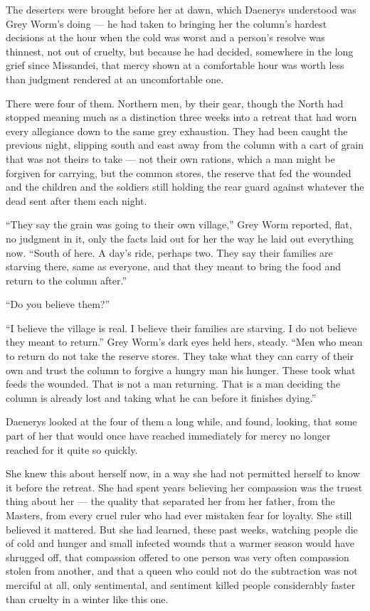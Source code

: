 The deserters were brought before her at dawn, which Daenerys understood was Grey Worm’s doing — he had taken to bringing her the column’s hardest decisions at the hour when the cold was worst and a person’s resolve was thinnest, not out of cruelty, but because he had decided, somewhere in the long grief since Missandei, that mercy shown at a comfortable hour was worth less than judgment rendered at an uncomfortable one.

There were four of them. Northern men, by their gear, though the North had stopped meaning much as a distinction three weeks into a retreat that had worn every allegiance down to the same grey exhaustion. They had been caught the previous night, slipping south and east away from the column with a cart of grain that was not theirs to take — not their own rations, which a man might be forgiven for carrying, but the common stores, the reserve that fed the wounded and the children and the soldiers still holding the rear guard against whatever the dead sent after them each night.

“They say the grain was going to their own village,” Grey Worm reported, flat, no judgment in it, only the facts laid out for her the way he laid out everything now. “South of here. A day’s ride, perhaps two. They say their families are starving there, same as everyone, and that they meant to bring the food and return to the column after.”

“Do you believe them?”

“I believe the village is real. I believe their families are starving. I do not believe they meant to return.” Grey Worm’s dark eyes held hers, steady. “Men who mean to return do not take the reserve stores. They take what they can carry of their own and trust the column to forgive a hungry man his hunger. These took what feeds the wounded. That is not a man returning. That is a man deciding the column is already lost and taking what he can before it finishes dying.”

\sceneBreak

Daenerys looked at the four of them a long while, and found, looking, that some part of her that would once have reached immediately for mercy no longer reached for it quite so quickly.

She knew this about herself now, in a way she had not permitted herself to know it before the retreat. She had spent years believing her compassion was the truest thing about her — the quality that separated her from her father, from the Masters, from every cruel ruler who had ever mistaken fear for loyalty. She still believed it mattered. But she had learned, these past weeks, watching people die of cold and hunger and small infected wounds that a warmer season would have shrugged off, that compassion offered to one person was very often compassion stolen from another, and that a queen who could not do the subtraction was not merciful at all, only sentimental, and sentiment killed people considerably faster than cruelty in a winter like this one.


